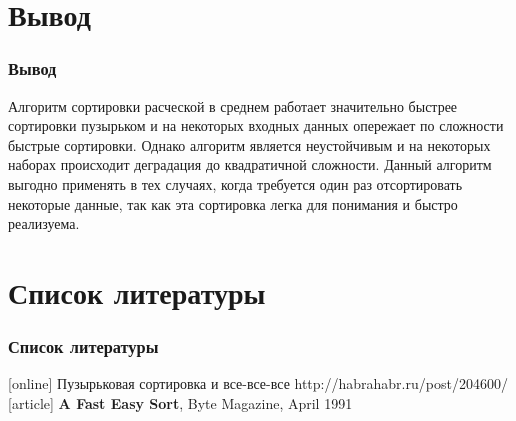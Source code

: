 \documentclass{beamer}
\newcommand{\br}{\pause \linebreak \linebreak}
\begin{document}
\section{Вывод}
\begin{frame}
    \frametitle{Вывод}
    Алгоритм сортировки расческой в среднем работает значительно быстрее сортировки пузырьком и на некоторых входных данных опережает по сложности быстрые сортировки.
    Однако алгоритм является неустойчивым и на некоторых наборах происходит деградация до квадратичной сложности.
    \br
    Данный алгоритм выгодно применять в тех случаях, когда требуется один раз отсортировать некоторые данные, так как эта сортировка легка для понимания и быстро реализуема.
\end{frame}

\section{Список литературы}
\begin{frame}
    \frametitle{Список литературы}
    \begin{thebibliography}{3}
        [online]
         {Пузырьковая сортировка и все-все-все} {\tiny{http://habrahabr.ru/post/204600/}}
        [article]
         {\bf A Fast Easy Sort},
            Byte Magazine, April 1991
    \end{thebibliography}
\end{frame}
\end{document}

